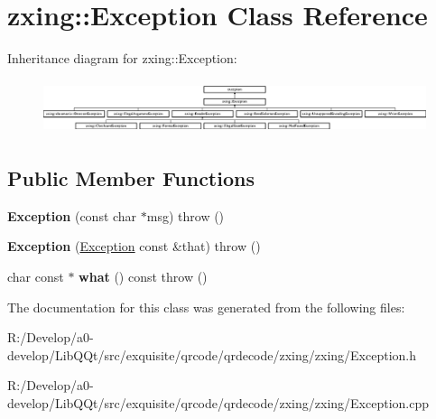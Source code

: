 \hypertarget{classzxing_1_1_exception}{}\section{zxing\+:\+:Exception Class Reference}
\label{classzxing_1_1_exception}
Inheritance diagram for zxing\+:\+:Exception\+:\begin{figure}[H]
\begin{center}
\leavevmode
\includegraphics[height=1.595442cm]{classzxing_1_1_exception}
\end{center}
\end{figure}
\subsection*{Public Member Functions}
\begin{DoxyCompactItemize}
\item 
\mbox{\label{classzxing_1_1_exception_a7390793b9645a0b83b19dc14dc5c58cc}} 
{\bfseries Exception} (const char $\ast$msg)  throw ()
\item 
\mbox{\label{classzxing_1_1_exception_a4b02210a7594471d8536c2062de8ab43}} 
{\bfseries Exception} (\mbox{\hyperlink{classzxing_1_1_exception}{Exception}} const \&that)  throw ()
\item 
\mbox{\label{classzxing_1_1_exception_afe1bd86c37d110c2bbd73632e2847c58}} 
char const  $\ast$ {\bfseries what} () const  throw ()
\end{DoxyCompactItemize}


The documentation for this class was generated from the following files\+:\begin{DoxyCompactItemize}
\item 
R\+:/\+Develop/a0-\/develop/\+Lib\+Q\+Qt/src/exquisite/qrcode/qrdecode/zxing/zxing/Exception.\+h\item 
R\+:/\+Develop/a0-\/develop/\+Lib\+Q\+Qt/src/exquisite/qrcode/qrdecode/zxing/zxing/Exception.\+cpp\end{DoxyCompactItemize}
